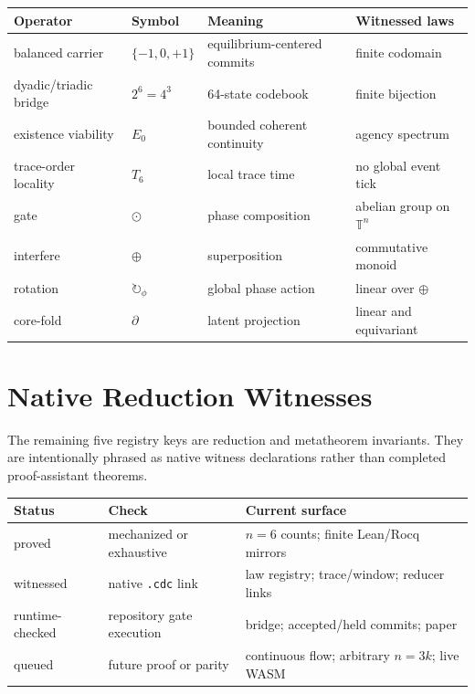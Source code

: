 \documentclass[11pt]{article}
\newcommand{\rot}{\circlearrowright}
\begin{document}
\begin{center}
\begin{tabular}{llll}
\toprule
Operator & Symbol & Meaning & Witnessed laws\\
\midrule
balanced carrier & $\{-1,0,+1\}$ & equilibrium-centered commits & finite codomain\\
dyadic/triadic bridge & $2^6=4^3$ & 64-state codebook & finite bijection\\
existence viability & $E_0$ & bounded coherent continuity & agency spectrum\\
trace-order locality & $T_6$ & local trace time & no global event tick\\
gate & $\odot$ & phase composition & abelian group on $\mathbb{T}^n$\\
interfere & $\oplus$ & superposition & commutative monoid\\
rotation & $\rot_\phi$ & global phase action & linear over $\oplus$\\
core-fold & $\partial$ & latent projection & linear and equivariant\\
\bottomrule
\end{tabular}
\end{center}

\section{Native Reduction Witnesses}

The remaining five registry keys are reduction and metatheorem invariants. They
are intentionally phrased as native witness declarations rather than completed
proof-assistant theorems.

\begin{center}
\small
\begin{tabular}{lll}
\toprule
Status & Check & Current surface\\
\midrule
proved & mechanized or exhaustive & $n=6$ counts; finite Lean/Rocq mirrors\\
witnessed & native \texttt{.cdc} link & law registry; trace/window; reducer links\\
runtime-checked & repository gate execution & bridge; accepted/held commits; paper\\
queued & future proof or parity & continuous flow; arbitrary $n=3k$; live WASM\\
\bottomrule
\end{tabular}
\end{center}
\end{document}
